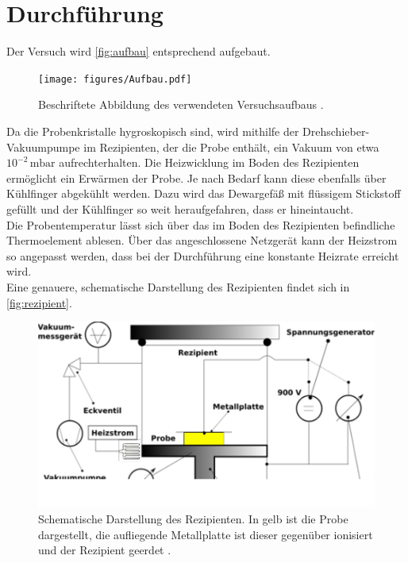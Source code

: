 \section{Durchführung}
\label{sec:Durchführung}

Der Versuch wird \autoref{fig:aufbau} entsprechend aufgebaut.

\begin{figure}[H]
    \centering
    \texttt{[image: figures/Aufbau.pdf]}
    \caption{Beschriftete Abbildung des verwendeten Versuchsaufbaus \cite{v48}.}
    \label{fig:aufbau}
\end{figure}

Da die Probenkristalle hygroskopisch sind, wird mithilfe der Drehschieber-Vakuumpumpe im Rezipienten, der die Probe enthält, ein Vakuum von etwa $10^{-2} \,\si{\milli\bar}$ aufrechterhalten. 
Die Heizwicklung im Boden des Rezipienten ermöglicht ein Erwärmen der Probe.
Je nach Bedarf kann diese ebenfalls über Kühlfinger abgekühlt werden. Dazu wird das Dewargefäß mit flüssigem Stickstoff gefüllt und der Kühlfinger so weit heraufgefahren, dass er hineintaucht. \\
Die Probentemperatur lässt sich über das im Boden des Rezipienten befindliche Thermoelement ablesen.
Über das angeschlossene Netzgerät kann der Heizstrom so angepasst werden, dass bei der Durchführung eine konstante Heizrate erreicht wird. \\
Eine genauere, schematische Darstellung des Rezipienten findet sich in \autoref{fig:rezipient}.

\begin{figure}[H]
    \centering
    \includegraphics[]{figures/Rezipient.pdf}
    \caption{Schematische Darstellung des Rezipienten. In gelb ist die Probe dargestellt, die aufliegende Metallplatte ist dieser gegenüber ionisiert und der Rezipient geerdet \cite{v48}.}
    \label{fig:rezipient}
\end{figure}

